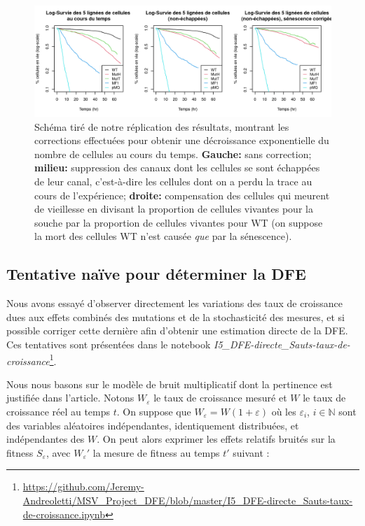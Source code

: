 \documentclass[12pt]{article}
\newcounter{prop}[section]
\newcommand{\En}{\mathbb{N}}
\begin{document}
\begin{figure}[h]
  \begin{center}
    \vspace{3mm}
    \includegraphics[scale=0.8]{../Img/Survival.png}
  \end{center} 
  \caption{\label{fig:survival}Schéma tiré de notre réplication des résultats, montrant les corrections effectuées pour obtenir une décroissance exponentielle du nombre de cellules au cours du temps. \textbf{Gauche:} sans correction; \textbf{milieu:} suppression des canaux dont les cellules se sont échappées de leur canal, c'est-à-dire les cellules dont on a perdu la trace au cours de l'expérience; \textbf{droite:} compensation des cellules qui meurent de vieillesse en divisant la proportion de cellules vivantes pour la souche par la proportion de cellules vivantes pour WT (on suppose la mort des cellules WT n'est causée \emph{que} par la sénescence).}
\end{figure}

\FloatBarrier
\subsection{Tentative naïve pour déterminer la DFE}

Nous avons essayé d'observer directement les variations des taux de croissance dues aux effets combinés des mutations et de la stochasticité des mesures, et si possible corriger cette dernière afin d'obtenir une estimation directe de la DFE. Ces tentatives sont présentées dans le notebook \emph{I5\_DFE-directe\_Sauts-taux-de-croissance}\footnote{\url{https://github.com/Jeremy-Andreoletti/MSV_Project_DFE/blob/master/I5_DFE-directe_Sauts-taux-de-croissance.ipynb}}.

Nous nous basons sur le modèle de bruit multiplicatif dont la pertinence est justifiée dans l'article.
Notons $W_\varepsilon$ le taux de croissance mesuré et $W$ le taux de croissance réel au temps $t$. On suppose que $W_\varepsilon=W(1+\varepsilon)$ où les $\varepsilon_i$, $i\in\En$ sont des variables aléatoires indépendantes, identiquement distribuées, et indépendantes des $W$. On peut alors exprimer les effets relatifs bruités sur la fitness $S_\varepsilon$, avec $W_\varepsilon'$ la mesure de fitness au temps $t'$ suivant :
\end{document}
